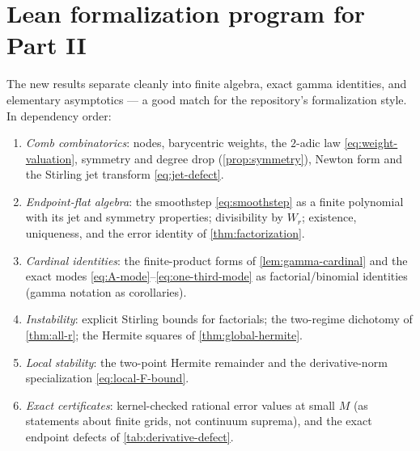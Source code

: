 \documentclass[11pt,oneside]{article}
\numberwithin{equation}{section}
\theoremstyle{definition}
\theoremstyle{remark}
\begin{document}
\section{Lean formalization program for Part II}
\label{sec:lean-interp}

The new results separate cleanly into finite algebra, exact gamma
identities, and elementary asymptotics --- a good match for the
repository's formalization style.  In dependency order:

\begin{enumerate}
\item\emph{Comb combinatorics}: nodes, barycentric weights, the
$2$-adic law \eqref{eq:weight-valuation}, symmetry and degree drop
(\cref{prop:symmetry}), Newton form and the Stirling jet transform
\eqref{eq:jet-defect}.
\item\emph{Endpoint-flat algebra}: the smoothstep
\eqref{eq:smoothstep} as a finite polynomial with its jet and
symmetry properties; divisibility by $W_r$; existence, uniqueness,
and the error identity of \cref{thm:factorization}.
\item\emph{Cardinal identities}: the finite-product forms of
\cref{lem:gamma-cardinal} and the exact modes
\eqref{eq:A-mode}--\eqref{eq:one-third-mode} as factorial/binomial
identities (gamma notation as corollaries).
\item\emph{Instability}: explicit Stirling bounds for factorials; the
two-regime dichotomy of \cref{thm:all-r}; the Hermite squares of
\cref{thm:global-hermite}.
\item\emph{Local stability}: the two-point Hermite remainder and the
derivative-norm specialization \eqref{eq:local-F-bound}.
\item\emph{Exact certificates}: kernel-checked rational error values
at small $M$ (as statements about finite grids, not continuum
suprema), and the exact endpoint defects of
\cref{tab:derivative-defect}.
\end{enumerate}
\end{document}
